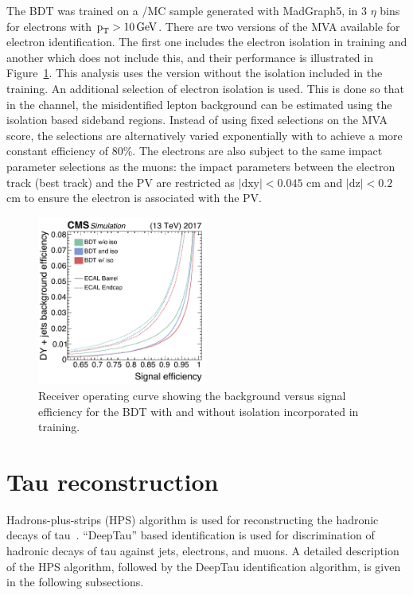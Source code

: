 The BDT was trained on a \PZ/\Pgg MC sample generated with MadGraph5, in 3 $\eta$ bins for electrons with $\text{p}_\text{T} > 10 \,\text{Ge\hspace{-.08em}V}$. There are two versions of the MVA available for electron identification. The first one includes the electron isolation in training and another which does not include this, and their performance is illustrated in Figure~\ref{fig:elec_BDT}. This analysis uses the version without the isolation included in the training. An additional selection of electron isolation is used. This is done so that in the \ehad channel, the misidentified lepton background can be estimated using the isolation based sideband regions. Instead of using fixed selections on the MVA score, the selections are alternatively varied exponentially with \pt to achieve a more constant efficiency of 80\%. The electrons are also subject to the same impact parameter selections as the muons: the impact parameters between the electron track (best track) and the PV are restricted as $|\text{dxy}| < 0.045$ cm and $|\text{dz}| < 0.2$ cm to ensure the electron is associated with the PV.

\begin{figure}[!htpb]
  \centering
  \includegraphics[width=0.5\textwidth]{plots/chapter5/BDT.png}
  \caption{Receiver operating curve showing the background versus signal efficiency for the BDT with and without isolation incorporated in training.}
  \label{fig:elec_BDT}
\end{figure}

\section{Tau reconstruction}

Hadrons-plus-strips (HPS) algorithm is used for reconstructing the hadronic decays of tau~\cite{Sirunyan:2018pgf}. ``DeepTau'' based identification is used for discrimination of hadronic decays of tau against jets, electrons, and muons. A detailed description of the HPS algorithm, followed by the DeepTau identification algorithm, is given in the following subsections.

